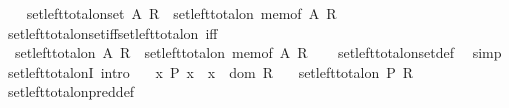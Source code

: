 \begin{isabellebody}
\ \ \isamarkupfalse%
\ {\isachardoublequoteopen}set{\isacharunderscore}{\kern0pt}left{\isacharunderscore}{\kern0pt}total{\isacharunderscore}{\kern0pt}on{\isacharunderscore}{\kern0pt}set\ A\ R\ {\isasymequiv}\ set{\isacharunderscore}{\kern0pt}left{\isacharunderscore}{\kern0pt}total{\isacharunderscore}{\kern0pt}on\ {\isacharparenleft}{\kern0pt}mem{\isacharunderscore}{\kern0pt}of\ A{\isacharparenright}{\kern0pt}\ R{\isachardoublequoteclose}\isanewline
{}\isamarkupfalse%
\isanewline
\isanewline
{}\isamarkupfalse%
\ set{\isacharunderscore}{\kern0pt}left{\isacharunderscore}{\kern0pt}total{\isacharunderscore}{\kern0pt}on{\isacharunderscore}{\kern0pt}set{\isacharunderscore}{\kern0pt}iff{\isacharunderscore}{\kern0pt}set{\isacharunderscore}{\kern0pt}left{\isacharunderscore}{\kern0pt}total{\isacharunderscore}{\kern0pt}on\ {\isacharbrackleft}{\kern0pt}iff{\isacharbrackright}{\kern0pt}{\isacharcolon}{\kern0pt}\isanewline
\ \ {\isachardoublequoteopen}set{\isacharunderscore}{\kern0pt}left{\isacharunderscore}{\kern0pt}total{\isacharunderscore}{\kern0pt}on\ A\ R\ {\isasymlongleftrightarrow}\ set{\isacharunderscore}{\kern0pt}left{\isacharunderscore}{\kern0pt}total{\isacharunderscore}{\kern0pt}on\ {\isacharparenleft}{\kern0pt}mem{\isacharunderscore}{\kern0pt}of\ A{\isacharparenright}{\kern0pt}\ R{\isachardoublequoteclose}\isanewline
%
\isadelimproof
\ \ %
\endisadelimproof
%
\isatagproof
{}\isamarkupfalse%
\ set{\isacharunderscore}{\kern0pt}left{\isacharunderscore}{\kern0pt}total{\isacharunderscore}{\kern0pt}on{\isacharunderscore}{\kern0pt}set{\isacharunderscore}{\kern0pt}def\ \isamarkupfalse%
\ simp%
\endisatagproof
{\isafoldproof}%
%
\isadelimproof
\isanewline
%
\endisadelimproof
\isanewline
{}\isamarkupfalse%
\ set{\isacharunderscore}{\kern0pt}left{\isacharunderscore}{\kern0pt}total{\isacharunderscore}{\kern0pt}onI\ {\isacharbrackleft}{\kern0pt}intro{\isacharbrackright}{\kern0pt}{\isacharcolon}{\kern0pt}\isanewline
\ \ \ {\isachardoublequoteopen}{\isasymAnd}x{\isachardot}{\kern0pt}\ P\ x\ {\isasymLongrightarrow}\ x\ {\isasymin}\ dom\ R{\isachardoublequoteclose}\isanewline
\ \ \ {\isachardoublequoteopen}set{\isacharunderscore}{\kern0pt}left{\isacharunderscore}{\kern0pt}total{\isacharunderscore}{\kern0pt}on\ P\ R{\isachardoublequoteclose}\isanewline
%
\isadelimproof
\ \ %
\endisadelimproof
%
\isatagproof
{}\isamarkupfalse%
\ set{\isacharunderscore}{\kern0pt}left{\isacharunderscore}{\kern0pt}total{\isacharunderscore}{\kern0pt}on{\isacharunderscore}{\kern0pt}pred{\isacharunderscore}{\kern0pt}def\ \isamarkupfalse%

\end{isabellebody}
